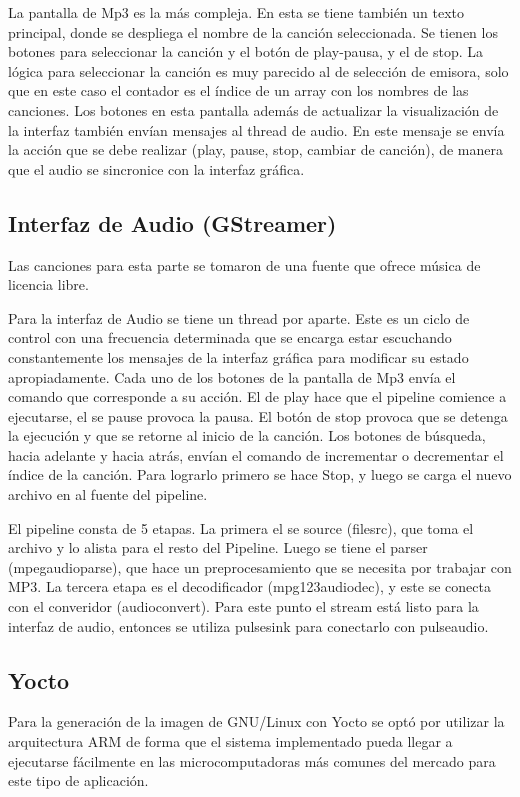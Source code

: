La pantalla de Mp3 es la más compleja. En esta se tiene también un texto principal, donde se
despliega el nombre de la canción seleccionada. Se tienen los botones para seleccionar la canción y
el botón de play-pausa, y el de stop. La lógica para seleccionar la canción es muy parecido al de
selección de emisora, solo que en este caso el contador es el índice de un array con los nombres de
las canciones. Los botones en esta pantalla además de actualizar la visualización de la interfaz
también envían mensajes al thread de audio. En este mensaje se envía la acción que se debe realizar
(play, pause, stop, cambiar de canción), de manera que el audio se sincronice con la interfaz
gráfica. 

\subsection{Interfaz de Audio (GStreamer)}
\label{sec:gstramer}
Las canciones para esta parte se tomaron de una fuente que ofrece música de licencia libre. %

Para la interfaz de Audio se tiene un thread por aparte. Este es un ciclo de control con una
frecuencia determinada que se encarga estar escuchando constantemente los mensajes de la interfaz
gráfica para modificar su estado apropiadamente. Cada uno de los botones de la pantalla de Mp3 envía
el comando que corresponde a su acción. El de play hace que el pipeline comience a ejecutarse, el se
pause provoca la pausa. El botón de stop provoca que se detenga la ejecución y que se retorne al
inicio de la canción. Los botones de búsqueda, hacia adelante y hacia atrás, envían el comando de
incrementar o decrementar el índice de la canción. Para lograrlo primero se hace Stop, y luego se
carga el nuevo archivo en al fuente del pipeline. 

El pipeline consta de 5 etapas. La primera el se source (filesrc), que toma el archivo y lo alista
para el resto del Pipeline. Luego se tiene el parser (mpegaudioparse), que hace un preprocesamiento
que se necesita por trabajar con MP3. La tercera etapa es el decodificador (mpg123audiodec), y este
se conecta con el converidor (audioconvert). Para este punto el stream está listo para la interfaz
de audio, entonces se utiliza pulsesink para conectarlo con pulseaudio. 


\subsection{Yocto}
\label{sec:yocto}
Para la generación de la imagen de GNU/Linux con Yocto se optó por utilizar la
arquitectura ARM de forma que el sistema implementado pueda llegar a ejecutarse
fácilmente en las microcomputadoras más comunes del mercado para este tipo de
aplicación.

